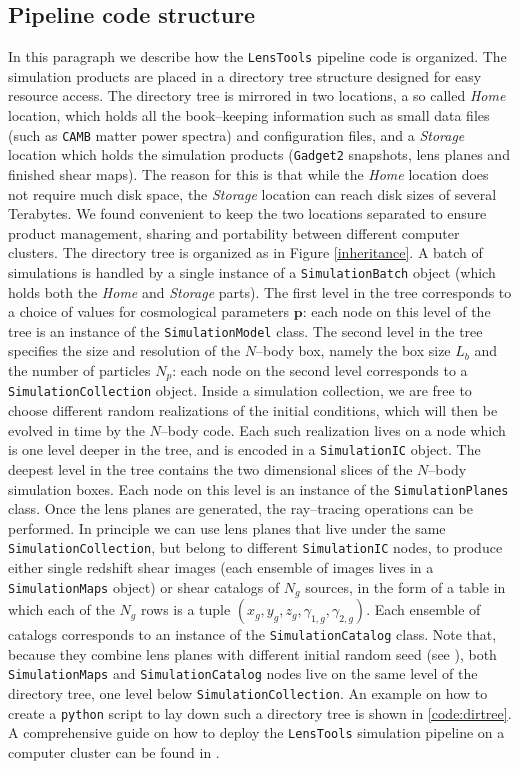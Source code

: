 \documentclass[5p]{elsarticle}
\newcommand{\bb}[1]{\mathbf{#1}}
\newcommand{\ttt}[1]{\texttt{#1}}
\newcommand{\LT}{\texttt{LensTools} }
\begin{document}
\subsection{Pipeline code structure}
%
In this paragraph we describe how the \LT pipeline code is organized. The simulation products are placed in a directory tree structure designed for easy resource access. The directory tree is mirrored in two locations, a so called \textit{Home} location, which holds all the book--keeping information such as small data files (such as \ttt{CAMB} matter power spectra) and configuration files, and a \textit{Storage} location which holds the simulation products (\ttt{Gadget2} snapshots, lens planes and finished shear maps). The reason for this is that while the \textit{Home} location does not require much disk space, the \textit{Storage} location can reach disk sizes of several Terabytes. We found convenient to keep the two locations separated to ensure product management, sharing and portability between different computer clusters. The directory tree is organized as in Figure \ref{inheritance}. 
A batch of simulations is handled by a single instance of a \ttt{SimulationBatch} object (which holds both the \textit{Home} and \textit{Storage} parts). The first level in the tree corresponds to a choice of values for cosmological parameters $\bb{p}$: each node on this level of the tree is an instance of the \ttt{SimulationModel} class. The second level in the tree specifies the size and resolution of the $N$--body box, namely the box size $L_b$ and the number of particles $N_p$: each node on the second level corresponds to a \ttt{SimulationCollection} object. Inside a simulation collection, we are free to choose different random realizations of the initial conditions, which will then be evolved in time by the $N$--body code. Each such realization lives on a node which is one level deeper in the tree, and is encoded in a \ttt{SimulationIC} object. The deepest level in the tree contains the two dimensional slices of the $N$--body simulation boxes. Each node on this level is an instance of the \ttt{SimulationPlanes} class. Once the lens planes are generated, the ray--tracing operations can be performed. In principle we can use lens planes that live under the same \ttt{SimulationCollection}, but belong to different \ttt{SimulationIC} nodes, to produce either single redshift shear images (each ensemble of images lives in a \ttt{SimulationMaps} object) or shear catalogs of $N_g$ sources, in the form of a table in which each of the $N_g$ rows is a tuple $(x_g,y_g,z_g,\gamma_{1,g},\gamma_{2,g})$. Each ensemble of catalogs corresponds to an instance of the \ttt{SimulationCatalog} class. Note that, because they combine lens planes with different initial random seed (see \citep{Petri16}), both \ttt{SimulationMaps} and \ttt{SimulationCatalog} nodes live on the same level of the directory tree, one level below \ttt{SimulationCollection}. An example on how to create a \ttt{python} script to lay down such a directory tree is shown in \ref{code:dirtree}. A comprehensive guide on how to deploy the \LT simulation pipeline on a computer cluster can be found in \citep{lenstoolsdocs}.      
\end{document}
